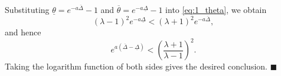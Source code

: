 \documentclass[letterpaper, 12pt, draftcls, onecolumn]{ieeeconf}
\begin{document}
\noindent{}
Substituting $\underline \theta = e^{-a\overline{\Delta}} - 1$ and
$\overline \theta  = e^{-a\underline{\Delta}} - 1$ into \eqref{eq:1_theta}, 
we obtain
\begin{equation*}
(\lambda-1)^2 e^{-a\underline{\Delta}} < (\lambda+1)^2 e^{-a\overline{\Delta}},
\end{equation*}
and hence
\begin{equation*}
e^{a(\overline{\Delta} - \underline{\Delta})} < 
\left( \frac{\lambda+1}{\lambda-1} \right) ^2.
\end{equation*}
Taking the logarithm function of both sides gives the desired conclusion.
\hspace*{\fill} $\blacksquare$
\end{document}
